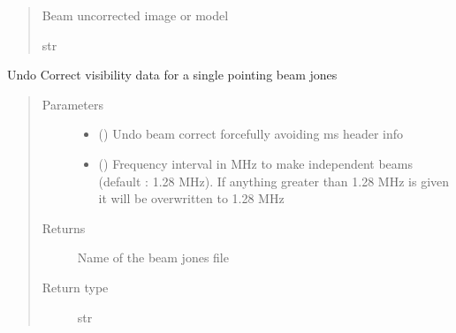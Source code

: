 \documentclass[letterpaper,10pt,english]{sphinxmanual}
\begin{document}
\begin{fulllineitems}
\begin{fulllineitems}
\begin{quote}
\begin{description}
\begin{itemize}
\end{itemize}

\item[{Returns}] \leavevmode
\sphinxAtStartPar
Beam un\sphinxhyphen{}corrected image or model

\item[{Return type}] \leavevmode
\sphinxAtStartPar
str

\end{description}\end{quote}

\end{fulllineitems}


\begin{fulllineitems}
\label{\detokenize{paircars:paircars.fullpol_selfcal_LTS.PolSelfcal.uncorrect_visibility_model_single_beam_jones}}
\sphinxAtStartPar
Undo Correct visibility data for a single pointing beam jones
\begin{quote}\begin{description}
\item[{Parameters}] \leavevmode\begin{itemize}
\item {} 
\sphinxAtStartPar
{} () \textendash{} Undo beam correct forcefully avoiding ms header info

\item {} 
\sphinxAtStartPar
{} () \textendash{} Frequency interval in MHz to make independent beams (default : 1.28 MHz). If anything greater than 1.28 MHz is given it will be overwritten to 1.28 MHz

\end{itemize}

\item[{Returns}] \leavevmode
\sphinxAtStartPar
Name of the beam jones file

\item[{Return type}] \leavevmode
\sphinxAtStartPar
str


\end{description}
\end{quote}
\end{fulllineitems}
\end{fulllineitems}
\end{document}
